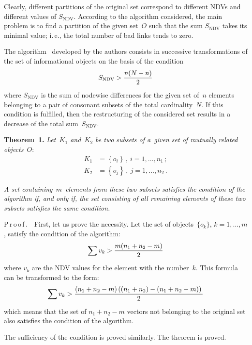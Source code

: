 \begin{multicols}{2}
     Clearly, different partitions of the original set correspond to different NDVs 
and different values of $S_{\mathrm{NDV}}$. According to the algorithm considered, 
the main problem is to find a partition of the given set~$O$ such that the sum 
$S_{\mathrm{NDV}}$ 
takes its minimal value; i.\,e., the total number of bad links tends to zero.
     
     The algorithm~\cite{4-d} developed by the authors consists in 
successive transformations of the set of informational objects on the basis of the 
condition
     $$
     S_{\mathrm{NDV}} > \displaystyle\frac{\displaystyle n(N-n)\mathstrut}{\displaystyle 2\mathstrut}
     $$
     where $S_{\mathrm{NDV}}$ is the sum of nodewise differences for the given 
set of~$n$ elements belonging to a pair of consonant subsets of the total 
cardinality~$N$.  If this condition is fulfilled, then the restructuring of the 
considered set results in a decrease of the total sum~$S_{\mathrm{NDV}}$.
     \smallskip
     
     \noindent
     \textbf{Theorem~1.} \textit{Let~$K_1$ and~$K_2$ be two subsets of 
a~given set of mutually related objects~$O$}:
     \begin{align*}
     K_1 &= \left\{ o_i\right\}\,,\ i=1,\ldots, n_1\,;\\
     K_2&= \left\{ o_j\right\}\,, \ j=1,\ldots , n_2\,.
     \end{align*}
     
     \textit{A set containing~$m$~elements from these two subsets satisfies the 
condition of the algorithm if, and only if, the set consisting of all remaining 
elements of these two subsets satisfies the same condition.}
     
     \smallskip
     
     \noindent
     P\,r\,o\,o\,f\,.\ \  First, let us prove the necessity. Let the set of 
objects~$\{o_k\}$, $k = 1,\ldots , m$, satisfy the condition of the algorithm:
     $$
     \sum v_k> \displaystyle\frac{\displaystyle m(n_1+n_2-m)\mathstrut}{\displaystyle 2\mathstrut}
     $$
     where $v_k$ are the NDV values for the element with the number~$k$. 
This formula can be transformed to the form:
     $$
     \sum v_k > \displaystyle\frac{\displaystyle \left(n_1+n_2-m\right)
     \left(\left(n_1+n_2\right)-\left(n_1+n_2-m\right)\right)\mathstrut}{\displaystyle 2\mathstrut}
     $$
     which means that the set of $n_1+n_2-m$ vectors not belonging to the 
original set also satisfies the condition of the algorithm.
     
     The sufficiency of the condition is proved similarly. The theorem is proved.
     
     \smallskip
     

\end{multicols}
